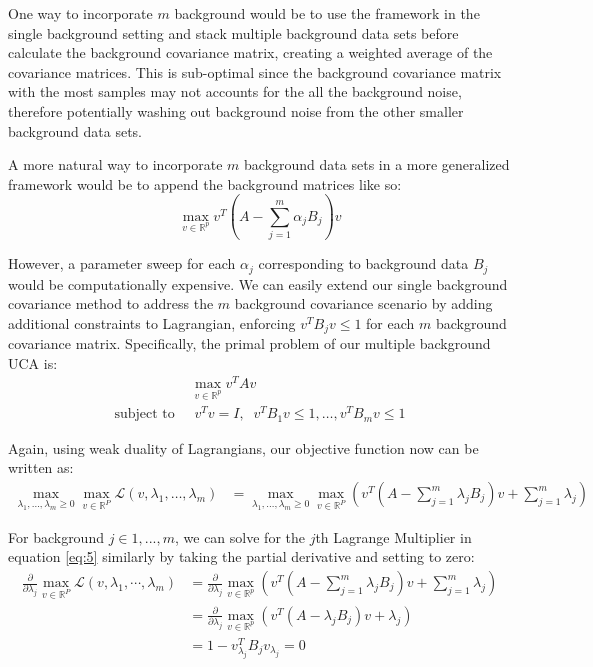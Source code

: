\documentclass[12pt]{article}
\begin{document}
One way to incorporate $m$ background would be to use the framework in the single background setting and stack multiple background data sets before calculate the background covariance matrix, creating a weighted average of the covariance matrices. This is sub-optimal since the background covariance matrix with the most samples may not accounts for the all the background noise, therefore potentially washing out background noise from the other smaller background data sets. 

A more natural way to incorporate $m$ background data sets in a more generalized framework would be to append the background matrices like so:
\[\max_{v\in \mathbb{R}^p}{v^T\left(A - \sum^{m}_{j=1}{\alpha_jB_j}\right)v}\]

However, a parameter sweep for each $\alpha_j$ corresponding to background data $B_j$ would be computationally expensive.
We can easily extend our single background covariance method to address the $m$ background covariance scenario by adding additional constraints to Lagrangian, enforcing $ v^TB_jv\leq 1$ for each $m$ background covariance matrix. Specifically, the primal problem of our multiple background UCA is:
 \begin{align}
         &\max_{v\in \mathbb{R}^p}{v^TAv} \label{eq:4}\\ 
         \text{subject to }&\; v^{T}v=I,\;\; v^TB_1 v \leq 1, \ldots, v^T B_m v\leq 1 \nonumber
     \end{align}

Again, using weak duality of Lagrangians, our objective function now can be written as:
\begin{align}
    \max_{\lambda_1,\ldots,\lambda_m \geq 0}{\max_{v\in \mathbb{R}^{P}}{\mathcal{L}\left(v, \lambda_1, \ldots, \lambda_m\right)}}%
    &=\max_{\lambda_1,\ldots,\lambda_m \geq 0}{\max_{v\in \mathbb{R}^{P}}{\left(v^T\left(A - \sum^{m}_{j = 1}{\lambda_j B_j}\right)v + \sum^{m}_{j=1}{\lambda_j}\right)}} \label{eq:5}
\end{align}

For background $j \in 1,...,m$, we can solve for the $j$th Lagrange Multiplier in equation \ref{eq:5} similarly by taking the partial derivative and setting to zero:
\begin{align}
    \frac{\partial}{\partial \lambda_j}\max_{v\in \mathbb{R}^{P}}{\mathcal{L}\left(v, \lambda_1, \cdots, \lambda_m\right)}&=\frac{\partial}{\partial \lambda_j}\max_{v\in \mathbb{R}^p}\left(v^T\left(A - \sum^{m}_{j = 1}{\lambda_j B_j}\right)v + \sum^{m}_{j=1}{\lambda_j}\right)\nonumber\\
    &= \frac{\partial}{\partial \lambda_j}\max_{v\in \mathbb{R}^p}\left(v^T\left(A - \lambda_j B_j \right)v+\lambda_j\right)\nonumber \\ 
    &= 1-v_{\lambda_j}^{T}B_j v_{\lambda_j} = 0 \label{eq:6}
\end{align}
\end{document}
